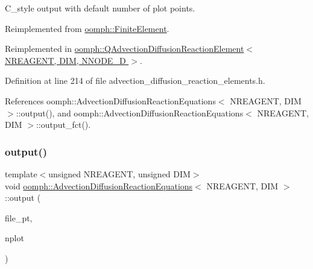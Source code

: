 C\+\_\+style output with default number of plot points. 



Reimplemented from \hyperlink{classoomph_1_1FiniteElement_a72cddd09f8ddbee1a20a1ff404c6943e}{oomph\+::\+Finite\+Element}.



Reimplemented in \hyperlink{classoomph_1_1QAdvectionDiffusionReactionElement_a5a3333fcb25ba0d5e74e74c2964d8d1c}{oomph\+::\+Q\+Advection\+Diffusion\+Reaction\+Element$<$ N\+R\+E\+A\+G\+E\+N\+T, D\+I\+M, N\+N\+O\+D\+E\+\_\+D $>$}.



Definition at line 214 of file advection\+\_\+diffusion\+\_\+reaction\+\_\+elements.\+h.



References oomph\+::\+Advection\+Diffusion\+Reaction\+Equations$<$ N\+R\+E\+A\+G\+E\+N\+T, D\+I\+M $>$\+::output(), and oomph\+::\+Advection\+Diffusion\+Reaction\+Equations$<$ N\+R\+E\+A\+G\+E\+N\+T, D\+I\+M $>$\+::output\+\_\+fct().

\mbox{\label{classoomph_1_1AdvectionDiffusionReactionEquations_a1ada1e57cac4bff9ecf73520a907b7c8}} 
\subsubsection{\texorpdfstring{output()}{output()}\hspace{0.1cm}{\footnotesize\ttfamily [4/4]}}
{\footnotesize\ttfamily template$<$unsigned N\+R\+E\+A\+G\+E\+NT, unsigned D\+IM$>$ \\
void \hyperlink{classoomph_1_1AdvectionDiffusionReactionEquations}{oomph\+::\+Advection\+Diffusion\+Reaction\+Equations}$<$ N\+R\+E\+A\+G\+E\+NT, D\+IM $>$\+::output (\begin{DoxyParamCaption}\item[{F\+I\+LE $\ast$}]{file\+\_\+pt,  }\item[{const unsigned \&}]{nplot }\end{DoxyParamCaption})\hspace{0.3cm}{\ttfamily [virtual]}}



